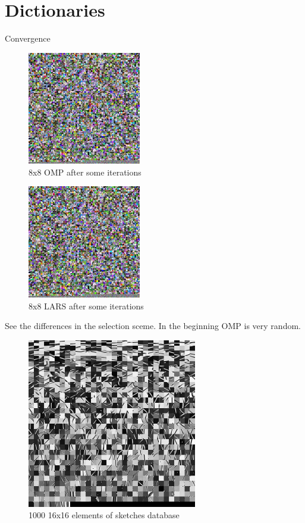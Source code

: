 \section{Dictionaries}

Convergence

\begin{figure}[h]
\centering
\includegraphics[width = 0.44\textwidth]{images/8_4000_10000_10_lasso.png} 
\caption{8x8 OMP after some iterations}
\label{fig:8_4000_lasso}
\end{figure}

\begin{figure}[h]
\centering
\includegraphics[width = 0.44\textwidth]{images/8_4000_10000_10_lasso.png} 
\caption{8x8 LARS after some iterations}
\label{fig:8_4000_lasso}
\end{figure}

See the differences in the selection sceme.
In the beginning OMP is very random.

\begin{figure}[h]
\centering
\includegraphics[width = 0.66\textwidth]{images/1000_sketches.png}
\caption{1000 16x16 elements of sketches database}
\label{fig:16_1000_lasso}
\end{figure}

